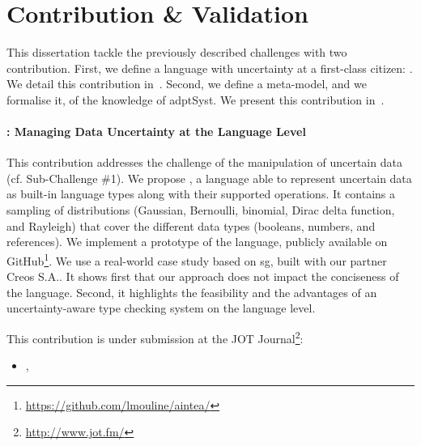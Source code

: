 \section{Contribution \& Validation}

This dissertation tackle the previously described challenges with two contribution.
First, we define a language with uncertainty at a first-class citizen: \langName.
We detail this contribution in~.
Second, we define a meta-model, and we formalise it, of the knowledge of \gls{adptSyst}.
We present this contribution in~.

\paragraph{\langName{}: Managing Data Uncertainty at the Language Level}
This contribution addresses the challenge of the manipulation of uncertain data (cf. Sub-Challenge \#1).%
 We propose \langName{}, a language able to represent uncertain data as built-in language types along with their supported operations. 
 It contains a sampling of distributions (Gaussian, Bernoulli, binomial, Dirac delta function, and Rayleigh) that cover the different data types (booleans, numbers, and references).
 We implement a prototype of the language, publicly available on GitHub\footnote{\url{https://github.com/lmouline/aintea/}}.
 We use a real-world case study based on \gls{sg}, built with our partner Creos S.A..
It shows first that our approach does not impact the conciseness of the language.
Second, it highlights the feasibility and the advantages of an uncertainty-aware type checking system on the language level.

This contribution is under submission at the JOT Journal\footnote{\url{http://www.jot.fm/}}:
\begin{itemize}
	\item {}, \citeauthor{insubmission:2019:comlan:datauncertainty}
\end{itemize}

